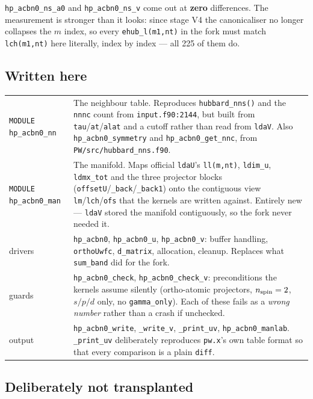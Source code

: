 \documentclass[11pt,a4paper]{article}
\newcommand{\C}[1]{\texttt{\small #1}}
\begin{document}
\noindent
\C{hp_acbn0_ns_a0} and \C{hp_acbn0_ns_v} come out at \textbf{zero}
differences. The measurement is stronger than it looks: since stage V4 the
canonicaliser no longer collapses the $m$ index, so every
\C{ehub_l(m1,nt)} in the fork must match \C{lch(m1,nt)} here literally, index by
index --- all 225 of them do.

\subsection{Written here}

\begin{center}\small
\begin{tabularx}{\textwidth}{lX}
\toprule
\C{MODULE hp_acbn0_nn} & The neighbour table. Reproduces \C{hubbard_nns()} and
the \C{nnnc} count from \C{input.f90:2144}, but built from \C{tau}/\C{at}/\C{alat}
and a cutoff rather than read from \C{ldaV}. Also \C{hp_acbn0_symmetry} and
\C{hp_acbn0_get_nnc}, from \C{PW/src/hubbard_nns.f90}. \\
\addlinespace
\C{MODULE hp_acbn0_man} & The manifold. Maps official \C{ldaU}'s \C{ll(m,nt)},
\C{ldim_u}, \C{ldmx_tot} and the three projector blocks
(\C{offsetU}/\C{_back}/\C{_back1}) onto the contiguous view
\C{lm}/\C{lch}/\C{ofs} that the kernels are written against. Entirely new ---
\C{ldaV} stored the manifold contiguously, so the fork never needed it. \\
\addlinespace
drivers & \C{hp_acbn0}, \C{hp_acbn0_u}, \C{hp_acbn0_v}: buffer handling,
\C{orthoUwfc}, \C{d_matrix}, allocation, cleanup. Replaces what \C{sum_band}
did for the fork. \\
\addlinespace
guards & \C{hp_acbn0_check}, \C{hp_acbn0_check_v}: preconditions the kernels
assume silently (ortho-atomic projectors, $n_{\rm spin}=2$, $s/p/d$ only,
no \C{gamma_only}). Each of these fails as a \emph{wrong number} rather than a
crash if unchecked. \\
\addlinespace
output & \C{hp_acbn0_write}, \C{_write_v}, \C{_print_uv}, \C{hp_acbn0_manlab}.
\C{_print_uv} deliberately reproduces \C{pw.x}'s own table format so that every
comparison is a plain \C{diff}. \\
\bottomrule
\end{tabularx}
\end{center}

\subsection{Deliberately not transplanted}
\end{document}
